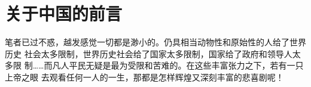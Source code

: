\chapter{关于中国的前言}







笔者已过不惑，越发感觉一切都是渺小的。仍具相当动物性和原始性的人给了世界历史
社会太多限制，世界历史社会给了国家太多限制，国家给了政府和领导人太多限
制……而凡人平民无疑是最为受限和苦难的。在这些丰富张力之下，若有一只上帝之眼
去观看任何一人的一生，那都是怎样辉煌又深刻丰富的悲喜剧呢！

